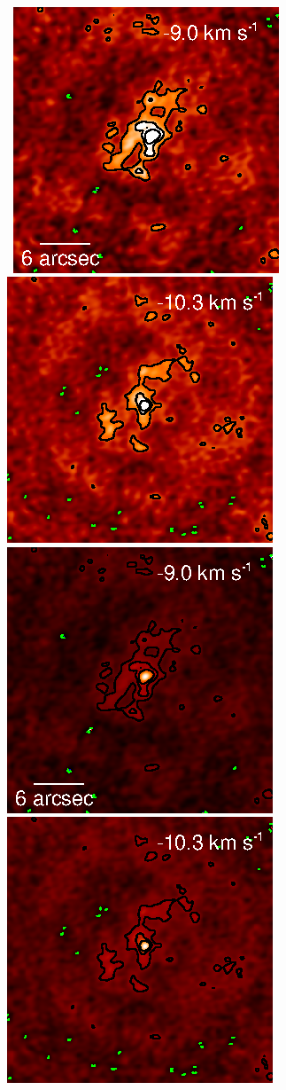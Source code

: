 \documentclass[preprint2]{aastex}
\begin{document}
\begin{figure}[hbt!]
{          }
\\
\mbox{
          \includegraphics[]{test34.ps}
          \includegraphics[]{test35.ps}
          \includegraphics[]{test_34.ps}
          \includegraphics[]{test_35.ps}
}
\end{figure}
\end{document}
